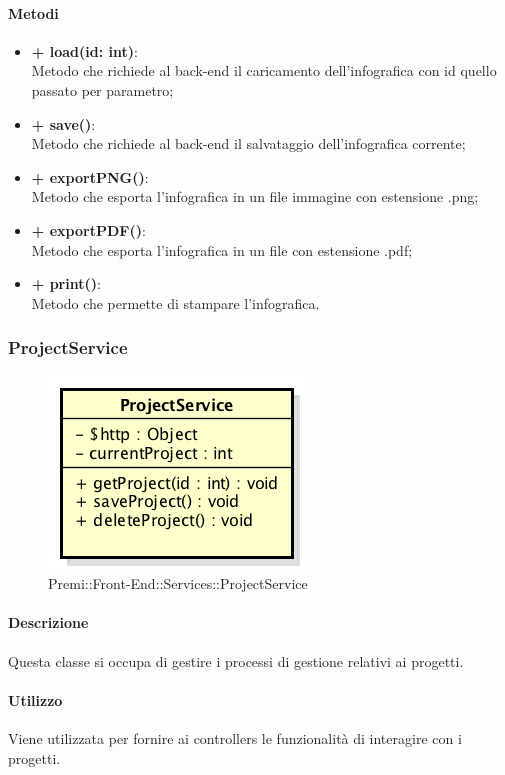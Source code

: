 	\paragraph{Metodi}
	\begin{itemize}
		\item \textbf{+ load(id: int)}:\\
		Metodo che richiede al back-end il caricamento dell'infografica con id quello passato per parametro;
		\item \textbf{+ save()}:\\
		Metodo che richiede al back-end il salvataggio dell'infografica corrente;
		\item \textbf{+ exportPNG()}:\\
		Metodo che esporta l'infografica in un file immagine con estensione .png;
		\item \textbf{+ exportPDF()}:\\
		Metodo che esporta l'infografica in un file con estensione .pdf;
		\item \textbf{+ print()}:\\
		Metodo che permette di stampare l'infografica.
	\end{itemize}
	
	
\subsubsection{ProjectService}
	\begin{figure}[h]
		\centering
		\includegraphics[width=0.4\linewidth]{img/premi_front_end_services_projectservice}
		\caption[Premi::Front-End::Services::ProjectService]{Premi::Front-End::Services::ProjectService}
	\end{figure}
	
	\paragraph{Descrizione}
	Questa classe si occupa di gestire i processi di gestione relativi ai progetti.
	
	\paragraph{Utilizzo}
	Viene utilizzata per fornire ai controllers le funzionalità di interagire con i progetti.
	
